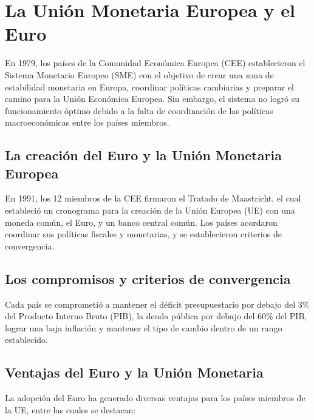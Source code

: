 \documentclass[
  a4paper,
]{article}
\begin{document}
\hypertarget{la-uniuxf3n-monetaria-europea-y-el-euro}{%
\section{La Unión Monetaria Europea y el
Euro}\label{la-uniuxf3n-monetaria-europea-y-el-euro}}

En 1979, los países de la Comunidad Económica Europea (CEE)
establecieron el Sistema Monetario Europeo (SME) con el objetivo de
crear una zona de estabilidad monetaria en Europa, coordinar políticas
cambiarias y preparar el camino para la Unión Económica Europea. Sin
embargo, el sistema no logró su funcionamiento óptimo debido a la falta
de coordinación de las políticas macroeconómicas entre los países
miembros.

\hypertarget{la-creaciuxf3n-del-euro-y-la-uniuxf3n-monetaria-europea}{%
\subsection{La creación del Euro y la Unión Monetaria
Europea}\label{la-creaciuxf3n-del-euro-y-la-uniuxf3n-monetaria-europea}}

En 1991, los 12 miembros de la CEE firmaron el Tratado de Maastricht, el
cual estableció un cronograma para la creación de la Unión Europea (UE)
con una moneda común, el Euro, y un banco central común. Los países
acordaron coordinar sus políticas fiscales y monetarias, y se
establecieron criterios de convergencia.

\hypertarget{los-compromisos-y-criterios-de-convergencia}{%
\subsection{Los compromisos y criterios de
convergencia}\label{los-compromisos-y-criterios-de-convergencia}}

Cada país se comprometió a mantener el déficit presupuestario por debajo
del 3\% del Producto Interno Bruto (PIB), la deuda pública por debajo
del 60\% del PIB, lograr una baja inflación y mantener el tipo de cambio
dentro de un rango establecido.

\hypertarget{ventajas-del-euro-y-la-uniuxf3n-monetaria}{%
\subsection{Ventajas del Euro y la Unión
Monetaria}\label{ventajas-del-euro-y-la-uniuxf3n-monetaria}}

La adopción del Euro ha generado diversas ventajas para los países
miembros de la UE, entre las cuales se destacan:
\end{document}
